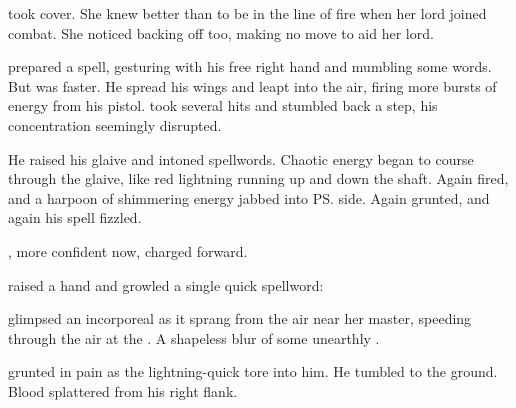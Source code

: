 \begin{garbage}
\Criseis{} took cover. 
She knew better than to be in the line of fire when her lord joined combat. 
She noticed \Achsah{} backing off too, making no move to aid her lord. 

\Ishnaruchaefir{} prepared a spell, gesturing with his free right hand and mumbling some words. 
But \Teshrial{} was faster. 
He spread his wings and leapt into the air, firing more bursts of energy from his pistol. 
\Ishnaruchaefir{} took several hits and stumbled back a step, his concentration seemingly disrupted. 

He raised his glaive and intoned spellwords. 
Chaotic energy began to course through the glaive, like red lightning running up and down the shaft. 
Again \Teshrial{} fired, and a harpoon of shimmering energy jabbed into \ps{\Ishnaruchaefir}{} side. 
Again \Ishnaruchaefir{} grunted, and again his spell fizzled. 

\Teshrial, more confident now, charged forward. 

\Ishnaruchaefir{} raised a hand and growled a single quick spellword:
\ta{\kingstongue{\Guthnyad!}}

\Criseis{} glimpsed an incorporeal \daemon{} as it sprang from the air near her master, speeding through the air at the \resphan. 
A shapeless blur of some unearthly \colour. 

\Teshrial{} grunted in pain as the lightning-quick \daemon{} tore into him. 
He tumbled to the ground. 
Blood splattered from his right flank. 


\begin{comment}
  Ishnaruchaefir charges. 
  Teshrial hops to his feet, dances out of the way and deflects the attack with a strong blow of his wing. 
  
  Teshrial leaps back and has time to fire his pistol a few times. 
  Ishnaruchaefir has to fend off the attack, which slows him down. 
  This gives Teshrial time to back off further, dump the gun and draw his senaan. 
  
  Ishnaruchaefir charges again. 
  Again Teshrial dodges and parries with his wing. 
  This time, before Ishnaruchaefir can attack again, Teshrial is lightning-quick and swings the senaan and hits Ishnaruchaefir. 
  

\end{comment}
\end{garbage}
